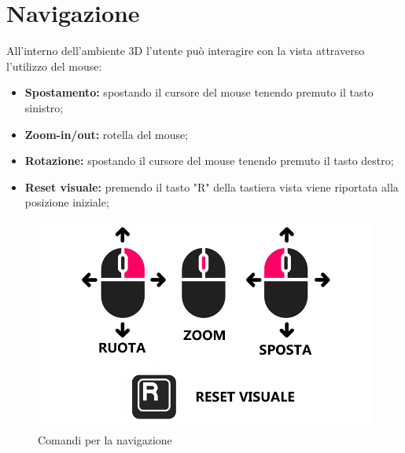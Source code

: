 \section{Navigazione}
All’interno dell'ambiente 3D l'utente può interagire con la vista attraverso l'utilizzo del mouse:
\begin{itemize}
    \item \textbf{Spostamento:} spostando il cursore del mouse tenendo premuto il tasto sinistro;
    \item \textbf{Zoom-in/out:} rotella del mouse;
    \item \textbf{Rotazione:} spostando il cursore del mouse tenendo premuto il tasto destro;
    \item \textbf{Reset visuale:} premendo il tasto "R" della tastiera vista viene riportata alla posizione iniziale;
\end{itemize}
\clearpage
\begin{figure}[ht!]
    \centering
    \includegraphics[scale=0.6]{template/images/comandi.png}
    \caption{Comandi per la navigazione}
\end{figure}


